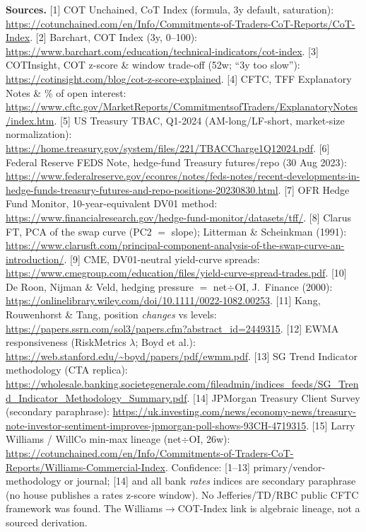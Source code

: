 \documentclass[10pt,a4paper]{article}
\newcommand{\rf}[1]{{\footnotesize[#1]}}
\begin{document}
\vspace{4pt}
{\footnotesize\color{biggrey}\textbf{Sources.}
\rf{1} COT Unchained, CoT Index (formula, 3y default, saturation): \url{https://cotunchained.com/en/Info/Commitments-of-Traders-CoT-Reports/CoT-Index}.
\rf{2} Barchart, COT Index (3y, 0--100): \url{https://www.barchart.com/education/technical-indicators/cot-index}.
\rf{3} COTInsight, COT z-score \& window trade-off (52w; ``3y too slow''): \url{https://cotinsight.com/blog/cot-z-score-explained}.
\rf{4} CFTC, TFF Explanatory Notes \& \% of open interest: \url{https://www.cftc.gov/MarketReports/CommitmentsofTraders/ExplanatoryNotes/index.htm}.
\rf{5} US Treasury TBAC, Q1-2024 (AM-long/LF-short, market-size normalization): \url{https://home.treasury.gov/system/files/221/TBACCharge1Q12024.pdf}.
\rf{6} Federal Reserve FEDS Note, hedge-fund Treasury futures/repo (30 Aug 2023): \url{https://www.federalreserve.gov/econres/notes/feds-notes/recent-developments-in-hedge-funds-treasury-futures-and-repo-positions-20230830.html}.
\rf{7} OFR Hedge Fund Monitor, 10-year-equivalent DV01 method: \url{https://www.financialresearch.gov/hedge-fund-monitor/datasets/tff/}.
\rf{8} Clarus FT, PCA of the swap curve (PC2 $=$ slope); Litterman \& Scheinkman (1991): \url{https://www.clarusft.com/principal-component-analysis-of-the-swap-curve-an-introduction/}.
\rf{9} CME, DV01-neutral yield-curve spreads: \url{https://www.cmegroup.com/education/files/yield-curve-spread-trades.pdf}.
\rf{10} De Roon, Nijman \& Veld, hedging pressure $=$ net$\div$OI, J.\ Finance (2000): \url{https://onlinelibrary.wiley.com/doi/10.1111/0022-1082.00253}.
\rf{11} Kang, Rouwenhorst \& Tang, position \emph{changes} vs levels: \url{https://papers.ssrn.com/sol3/papers.cfm?abstract_id=2449315}.
\rf{12} EWMA responsiveness (RiskMetrics $\lambda$; Boyd et al.): \url{https://web.stanford.edu/~boyd/papers/pdf/ewmm.pdf}.
\rf{13} SG Trend Indicator methodology (CTA replica): \url{https://wholesale.banking.societegenerale.com/fileadmin/indices_feeds/SG_Trend_Indicator_Methodology_Summary.pdf}.
\rf{14} JPMorgan Treasury Client Survey (secondary paraphrase): \url{https://uk.investing.com/news/economy-news/treasury-note-investor-sentiment-improves-jpmorgan-poll-shows-93CH-4719315}.
\rf{15} Larry Williams / WillCo min-max lineage (net$\div$OI, 26w): \url{https://cotunchained.com/en/Info/Commitments-of-Traders-CoT-Reports/Williams-Commercial-Index}.
Confidence: \rf{1--13} primary/vendor-methodology or journal; \rf{14} and all bank \emph{rates} indices are secondary paraphrase (no house publishes a rates z-score window). No Jefferies/TD/RBC public CFTC framework was found. The Williams$\to$COT-Index link is algebraic lineage, not a sourced derivation.}
\end{document}
